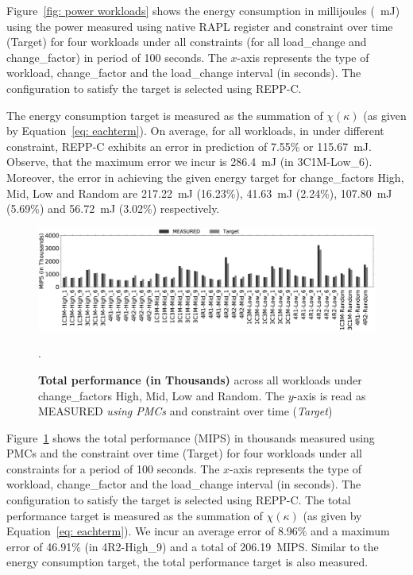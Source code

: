 Figure~\ref{fig: power workloads} shows the energy consumption in millijoules
(\SI{}{\milli\joule}) using the power \textsf{measured} using native RAPL register and
constraint over time (\textsf{Target}) for four workloads under all constraints (for all
load\_change and change\_factor) in period of 100 seconds. The $x$-axis represents the
type of workload, change\_factor and the load\_change interval (in seconds). The
configuration to satisfy the target is selected using REPP-C. 

The energy consumption target is measured as the summation of $\chi(\kappa)$ (as given by
Equation~\ref{eq: eachterm}).  On average, for all workloads, in under different
constraint, REPP-C exhibits an error in prediction of 7.55\% or \SI{115.67}{\milli\joule}.
Observe, that the maximum error we incur is \SI{286.4}{\milli\joule} (in 3C1M-Low\_6).
Moreover, the error in achieving the given energy target for change\_factors High, Mid,
Low and Random are \SI{217.22}{\milli\joule} (16.23\%), \SI{41.63}{\milli\joule} (2.24\%),
\SI{107.80}{\milli\joule} (5.69\%) and \SI{56.72}{\milli\joule} (3.02\%) respectively. 


\begin{figure}[t]
   \centering
    \includegraphics[width=\textwidth]{Chapter3/Figs/consolidation/final-perf.eps}
    \caption[Perfomance prediction for multiprogrammed workloads with
    REPP-C]{
    \textbf{Total performance (in Thousands)} across all workloads under change\_factors
    High, Mid, Low and Random. The $y$-axis is read as MEASURED \textit{using PMCs} and
    constraint over time (\textit{Target})}.  

    \label{fig: perf workloads} \end{figure}

Figure~\ref{fig: perf workloads} shows the total performance (MIPS) in thousands
\textsf{measured} using PMCs and the constraint over time (\textsf{Target}) for four
workloads under all constraints for a period of 100 seconds. The $x$-axis represents the
type of workload, change\_factor and the load\_change interval (in seconds). The
configuration to satisfy the target is selected using REPP-C.  The total performance
target is measured as the summation of $\chi(\kappa)$ (as given by Equation~\ref{eq:
eachterm}). We incur an average error of 8.96\% and a maximum error of 46.91\% (in
4R2-High\_9) and a total of \SI{206.19}{MIPS}.  Similar to the energy consumption target,
the total performance target is also measured.

